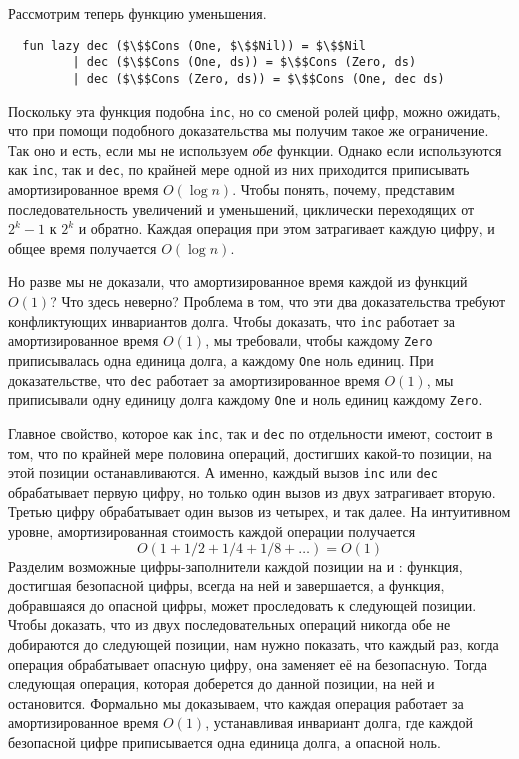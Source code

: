 Рассмотрим теперь функцию уменьшения.
\begin{lstlisting}
  fun lazy dec ($\$$Cons (One, $\$$Nil)) = $\$$Nil
         | dec ($\$$Cons (One, ds)) = $\$$Cons (Zero, ds)
         | dec ($\$$Cons (Zero, ds)) = $\$$Cons (One, dec ds)
\end{lstlisting}
Поскольку эта функция подобна \lstinline!inc!, но
со сменой ролей цифр, можно ожидать, что при помощи подобного
доказательства мы получим такое же ограничение. Так оно и есть, если
мы не используем \emph{обе} функции. Однако если используются как
\lstinline!inc!, так и \lstinline!dec!, по крайней мере одной из них
приходится приписывать амортизированное время $O(\log n)$. Чтобы понять,
почему, представим последовательность увеличений и уменьшений,
циклически переходящих от $2^k - 1$ к $2^k$ и обратно. Каждая операция
при этом затрагивает каждую цифру, и общее время получается $O(\log
n)$.

Но разве мы не доказали, что амортизированное время каждой из функций
$O(1)$? Что здесь неверно? Проблема в том, что эти два доказательства
требуют конфликтующих инвариантов долга. Чтобы доказать, что
\lstinline!inc! работает за амортизированное время $O(1)$, мы
требовали, чтобы каждому \lstinline!Zero! приписывалась одна единица
долга, а каждому \lstinline!One! ноль единиц. При доказательстве, что
\lstinline!dec! работает за амортизированное время $O(1)$, мы
приписывали одну единицу долга каждому \lstinline!One! и ноль единиц
каждому \lstinline!Zero!.

Главное свойство, которое как \lstinline!inc!, так и \lstinline!dec!
по отдельности имеют, состоит в том, что по крайней мере половина
операций, достигших какой-то позиции, на этой позиции
останавливаются. А именно, каждый вызов \lstinline!inc! или
\lstinline!dec! обрабатывает первую цифру, но только один вызов из
двух затрагивает вторую. Третью цифру обрабатывает один вызов из
четырех, и так далее. На интуитивном уровне, амортизированная
стоимость каждой операции получается
$$
O(1 + 1/2 + 1/4 + 1/8 + \ldots) = O(1)
$$
Разделим возможные цифры-заполнители каждой позиции на
 и : функция,
достигшая безопасной цифры, всегда на ней и завершается, а функция,
добравшаяся до опасной цифры, может проследовать к следующей
позиции. Чтобы доказать, что из двух последовательных операций никогда
обе не добираются до следующей позиции, нам нужно показать, что каждый
раз, когда операция обрабатывает опасную цифру, она заменяет её на
безопасную. Тогда следующая операция, которая доберется до данной
позиции, на ней и остановится. Формально мы доказываем, что каждая
операция работает за амортизированное время $O(1)$, устанавливая
инвариант долга, где каждой безопасной цифре приписывается одна
единица долга, а опасной ноль.

